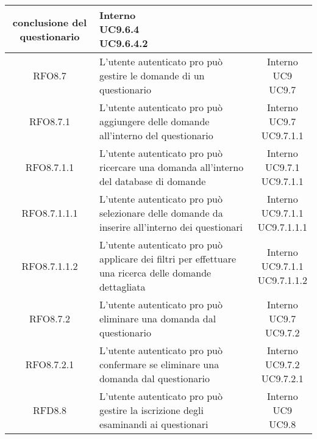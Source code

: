 \begin{longtable}{|c|>{\centering}m{7cm}|c|}
conclusione del questionario & \makecell{Interno\\ UC9.6.4 \\UC9.6.4.2 } \\ \hline
			 \hypertarget{{RFO8.7}}{{RFO8.7}} & L’utente autenticato pro può gestire le
domande di un questionario & \makecell{Interno\\ UC9 \\UC9.7 } \\ \hline
			 \hypertarget{{RFO8.7.1}}{{RFO8.7.1}} & L’utente autenticato pro può aggiungere
delle domande all’interno del questionario & \makecell{Interno\\ UC9.7 \\UC9.7.1.1 } \\ \hline
			 \hypertarget{{RFO8.7.1.1}}{{RFO8.7.1.1}} & L’utente autenticato pro può ricercare
una domanda all’interno del database di
domande & \makecell{Interno\\ UC9.7.1 \\UC9.7.1.1 } \\ \hline
			 \hypertarget{{RFO8.7.1.1.1}}{{RFO8.7.1.1.1}} & L’utente autenticato pro può selezionare
delle domande da inserire all’interno dei
questionari & \makecell{Interno\\ UC9.7.1.1 \\UC9.7.1.1.1 } \\ \hline
			 \hypertarget{{RFO8.7.1.1.2}}{{RFO8.7.1.1.2}} & L’utente autenticato pro può applicare
dei filtri per effettuare una ricerca delle
domande dettagliata & \makecell{Interno\\ UC9.7.1.1 \\UC9.7.1.1.2 } \\ \hline
			 \hypertarget{{RFO8.7.2}}{{RFO8.7.2}} & L’utente autenticato pro può eliminare
una domanda dal questionario & \makecell{Interno\\ UC9.7 \\UC9.7.2 } \\ \hline
			 \hypertarget{{RFO8.7.2.1}}{{RFO8.7.2.1}} & L’utente autenticato pro può confermare
se eliminare una domanda dal
questionario & \makecell{Interno\\ UC9.7.2 \\UC9.7.2.1 } \\ \hline
			 \hypertarget{{RFD8.8}}{{RFD8.8}} & L’utente autenticato pro può gestire la
iscrizione degli esaminandi ai questionari & \makecell{Interno\\ UC9 \\UC9.8 } \\ \hline

\end{longtable}

